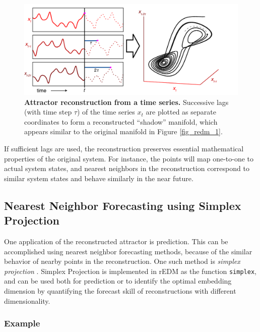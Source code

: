 \begin{figure}[!ht]
\begin{center}\includegraphics[width=\maxwidth{\textwidth}]{fig_redm_2.pdf}\end{center}
\caption[Attractor reconstruction from a time series.]{\textbf{Attractor reconstruction from a time series.}\newline
Successive lags (with time step $\tau$) of the time series $x_t$ are plotted as separate coordinates to form a reconstructed ``shadow'' manifold, which appears similar to the original manifold in Figure \ref{fig_redm_1}.}
\end{figure}

If sufficient lags are used, the reconstruction preserves essential mathematical properties of the original system. For instance, the points will map one-to-one to actual system states, and nearest neighbors in the reconstruction correspond to similar system states and behave similarly in the near future. 

\subsection{Nearest Neighbor Forecasting using Simplex Projection}

One application of the reconstructed attractor is prediction. This can be accomplished using nearest neighbor forecasting methods, because of the similar behavior of nearby points in the reconstruction. One such method is \emph{simplex projection} \cite{Sugihara_1990}. Simplex Projection is implemented in rEDM as the function \lstinline{simplex}, and can be used both for prediction or to identify the optimal embedding dimension by quantifying the forecast skill of reconstructions with different dimensionality.

\subsubsection{Example}

